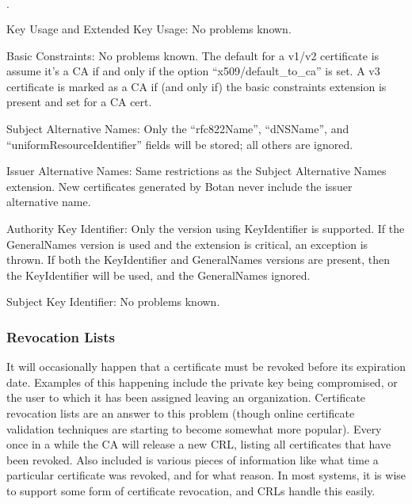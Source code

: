 \documentclass{article}
\begin{document}
\begin{list}{$\cdot$}
  \item Key Usage and Extended Key Usage: No problems known.
  \item

  \item Basic Constraints: No problems known. The default for a v1/v2
        certificate is assume it's a CA if and only if the option
        ``x509/default\_to\_ca'' is set. A v3 certificate is marked as a CA if
        (and only if) the basic constraints extension is present and set for a
        CA cert.

  \item Subject Alternative Names: Only the ``rfc822Name'', ``dNSName'', and
        ``uniformResourceIdentifier'' fields will be stored; all others are
        ignored.

  \item Issuer Alternative Names: Same restrictions as the Subject Alternative
        Names extension. New certificates generated by Botan never include the
        issuer alternative name.

  \item Authority Key Identifier: Only the version using KeyIdentifier is
        supported. If the GeneralNames version is used and the extension is
        critical, an exception is thrown. If both the KeyIdentifier and
        GeneralNames versions are present, then the KeyIdentifier will be
        used, and the GeneralNames ignored.

  \item Subject Key Identifier: No problems known.
\end{list}

\subsubsection{Revocation Lists}

It will occasionally happen that a certificate must be revoked before
its expiration date. Examples of this happening include the private
key being compromised, or the user to which it has been assigned
leaving an organization. Certificate revocation lists are an answer to
this problem (though online certificate validation techniques are
starting to become somewhat more popular). Every once in a while the
CA will release a new CRL, listing all certificates that have been
revoked. Also included is various pieces of information like what time
a particular certificate was revoked, and for what reason. In most
systems, it is wise to support some form of certificate revocation,
and CRLs handle this easily.
\end{document}

